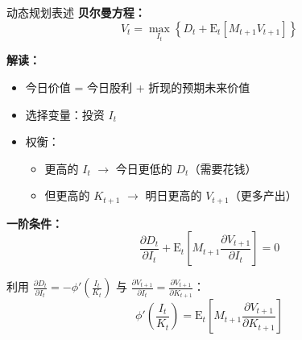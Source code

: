 \documentclass{beamer}
\begin{document}
\begin{frame}{动态规划表述}
    \textbf{贝尔曼方程：}
    \begin{equation}\label{equ:bellman}
        V_t = \max_{I_t} \left\{ D_t + \mathrm{E}_t\left[M_{t+1} V_{t+1}\right] \right\}
    \end{equation}

    \textbf{解读：}
    \begin{itemize}
        \item 今日价值 = 今日股利 + 折现的预期未来价值
        \item 选择变量：投资 $I_t$
        \item 权衡：
        \begin{itemize}
            \item 更高的 $I_t$ $\rightarrow$ 今日更低的 $D_t$（需要花钱）
            \item 但更高的 $K_{t+1}$ $\rightarrow$ 明日更高的 $V_{t+1}$（更多产出）
        \end{itemize}
    \end{itemize}


    \textbf{一阶条件：}
    \begin{equation}\label{equ:foc}
        \frac{\partial D_t}{\partial I_t} + \mathrm{E}_t\left[M_{t+1} \frac{\partial V_{t+1}}{\partial I_t}\right] = 0
    \end{equation}

    利用 $\frac{\partial D_t}{\partial I_t} = -\phi'\left(\frac{I_t}{K_t}\right)$ 与 $\frac{\partial V_{t+1}}{\partial I_t} = \frac{\partial V_{t+1}}{\partial K_{t+1}}$：
    \begin{equation}\label{equ:marginal}
        \phi'\left(\frac{I_t}{K_t}\right) = \mathrm{E}_t\left[M_{t+1} \frac{\partial V_{t+1}}{\partial K_{t+1}}\right]
    \end{equation}
\end{frame}
\end{document}
